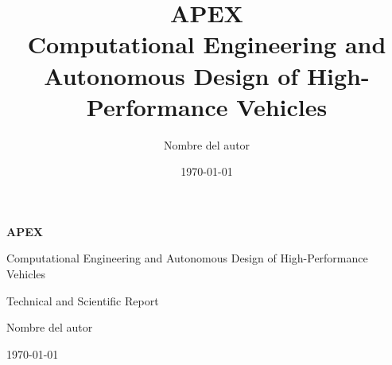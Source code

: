 \documentclass[12pt,a4paper,oneside]{report}
\title{
    \textbf{APEX}\\
    \large Computational Engineering and Autonomous Design
    of High-Performance Vehicles
}
\author{Nombre del autor}
\date{\today}
\begin{document}
\begin{titlepage}
    \centering

    \vspace*{2cm}

    {\Huge\bfseries APEX\par}

    \vspace{0.5cm}

    {\Large Computational Engineering and Autonomous Design
    of High-Performance Vehicles\par}

    \vspace{2cm}

    {\large Technical and Scientific Report\par}

    \vfill

    {\large Nombre del autor\par}

    \vspace{0.5cm}

    {\large \today\par}

\end{titlepage}


\tableofcontents

\clearpage
{}




\printbibliography[heading=bibintoc,title={Referencias bibliográficas}]
\end{document}
